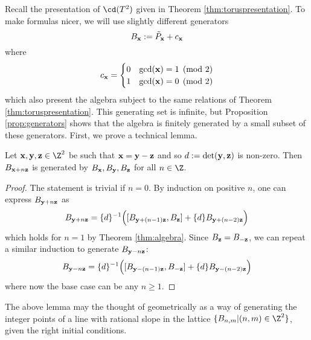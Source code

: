 Recall the presentation of $\cd(T^2)$ given in Theorem \ref{thm:toruspresentation}. To make formulas nicer, we will use slightly different generators
\[
B_{\mathbf{x}} := \tilde{P}_{\mathbf{x}} + c_{\mathbf{x}}
\]
where 
\[
c_{\mathbf{x}} = \begin{cases} 0 & \gcd({\mathbf{x}}) = 1 \pmod{2} \\ 1 & \gcd({\mathbf{x}}) = 0 \pmod{2} \end{cases}
\]
which also present the algebra subject to the same relations of Theorem \ref{thm:toruspresentation}. This generating set is infinite, but Proposition \ref{prop:generators} shows that the algebra is finitely generated by a small subset of these generators. First, we prove a technical lemma. 
\begin{lemma} \label{lem:generateline}
Let $\xx, \yy, \zz \in \Z^2$ be  such that ${\mathbf{x}} = {\mathbf{y}}-{\mathbf{z}}$ and so $d := \det({\mathbf{y}},{\mathbf{z}})$ is non-zero. Then $B_{{\mathbf{x}}+n{\mathbf{z}}}$ is generated by $B_{\mathbf{x}}, B_{\mathbf{y}}, B_{\mathbf{z}}$ for all $n \in \Z$. 
\end{lemma}
\begin{proof}
The statement is trivial if $n=0$. By induction on positive $n$, one can express $B_{{\mathbf{y}}+n{\mathbf{z}}}$ as
\[
    B_{{\mathbf{y}}+n{\mathbf{z}}} = \{ d \}^{-1} \Big( [B_{{\mathbf{y}}+ (n-1){\mathbf{z}}}, B_{\mathbf{z}}] + \{ d \} B_{{\mathbf{y}}+(n-2){\mathbf{z}}} \Big)
\]
which holds for $n=1$ by Theorem \ref{thm:algebra}. Since $B_{\mathbf{z}} = B_{-{\mathbf{z}}}$, we can repeat a similar induction to generate $B_{{\mathbf{y}} -n{\mathbf{z}}}$:
\[
    B_{{\mathbf{y}}-n{\mathbf{z}}} = \{ d \}^{-1} \Big( [ B_{{\mathbf{y}}-(n-1){\mathbf{z}}}, B_{-{\mathbf{z}}} ] + \{ d \} B_{{\mathbf{y}}-(n-2){\mathbf{z}}} \Big)
\]
where now the base case can be any $n \geq 1$. 
\end{proof}
The above lemma may the thought of geometrically as a way of generating the integer points of a line with rational slope in the lattice $\{ B_{n,m} \vert (n,m) \in \Z^2 \}$, given the right initial conditions.

